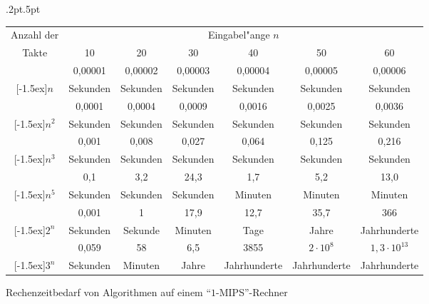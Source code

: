 \ifalgorithms
\else
\begin{figure}
{\renewcommand{\arraystretch}{1.2}\doublerulesep.2pt\arrayrulewidth.5pt
\footnotesize
\begin{center}
\begin{tabular}{|c|c|c|c|c|c|c|} \hline\hline
\multicolumn{1}{|c}{Anzahl der} 
& \multicolumn{6}{c|}{Eingabel"ange $n$}\\ \cline{2-7}
Takte & 10 & 20 & 30 & 40 & 50 & 60 \\ 
\hline\hline
 & 0,00001 & 0,00002 & 0,00003 & 0,00004 & 0,00005 & 0,00006 \\
\raisebox{1.5ex}[-1.5ex]{$n$} 
 & Sekunden & Sekunden & Sekunden & Sekunden & Sekunden & Sekunden \\ \hline
 & 0,0001 & 0,0004 & 0,0009 & 0,0016 & 0,0025 & 0,0036 \\
\raisebox{1.5ex}[-1.5ex]{$n^2$} 
 & Sekunden & Sekunden & Sekunden & Sekunden & Sekunden & Sekunden \\ \hline
 & 0,001 & 0,008 & 0,027 & 0,064 & 0,125 & 0,216 \\
\raisebox{1.5ex}[-1.5ex]{$n^3$} 
 & Sekunden & Sekunden & Sekunden & Sekunden & Sekunden & Sekunden \\ \hline
 & 0,1 & 3,2 & 24,3 & 1,7 & 5,2 & 13,0 \\
\raisebox{1.5ex}[-1.5ex]{$n^5$} 
 & Sekunden & Sekunden & Sekunden & Minuten & Minuten & Minuten \\ 
\hline\hline
 & 0,001 & 1 & 17,9 & 12,7 & 35,7 & 366 \\
\raisebox{1.5ex}[-1.5ex]{$2^n$} 
 & Sekunden & Sekunde & Minuten & Tage & Jahre & Jahrhunderte \\ \hline
 & 0,059 & 58 & 6,5 & 3855 & $2 \cdot 10^8$ & $1,3 \cdot 10^{13}$ \\
\raisebox{1.5ex}[-1.5ex]{$3^n$} 
 & Sekunden & Minuten & Jahre & Jahrhunderte & Jahrhunderte & Jahrhunderte \\ \hline\hline
\end{tabular}
\end{center}
}
\caption{Rechenzeitbedarf von Algorithmen auf einem "`$1$-MIPS"'-Rechner}
\label{runtimetab}
\end{figure}
\fi

